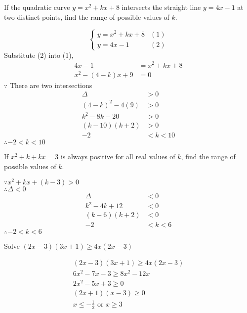 \documentclass[addpoints, 10pt]{exam}
\begin{document}
\begin{questions}
	\marksnotpoints
	\question[4] If the quadratic curve $y=x^2+kx+8$ intersects the straight line $y=4x-1$ at two distinct points, find the range of possible values of $k$.
	\begin{solutionorlines}[9cm]
		\begin{equation*}
			\begin{cases}
				y=x^2+kx+8 & (1) \\
				y=4x-1 & (2)
			\end{cases}
		\end{equation*}
		Substitute (2) into (1),
		\begin{align*}
			4x-1 &= x^2+kx+8 \\
			x^2-(4-k)x+9 &= 0
		\end{align*}
		$\because$ There are two intersections
		\begin{align*}
			\Delta &> 0 \\
			(4-k)^2-4(9) &> 0 \\
			k^2-8k-20 &> 0 \\
			(k-10)(k+2) &> 0 \\
			-2 &< k < 10
		\end{align*}
		$\therefore -2 < k < 10$
	\end{solutionorlines}

	\newpage

	\question[4] If $x^2+k+kx=3$ is always positive for all real values of $k$, find the range of possible values of $k$.
	\begin{solutionorlines}[9cm]
		$\because x^2+kx+(k-3) > 0$ \\
		$\therefore \Delta < 0$
		\begin{align*}
			\Delta &< 0 \\
			k^2-4k+12 &< 0 \\
			(k-6)(k+2) &< 0 \\
			-2 &< k < 6
		\end{align*}
		$\therefore -2 < k < 6$
	\end{solutionorlines}

	\question[3] Solve $(2x-3)(3x+1) \geq 4x(2x-3)$
	\begin{solutionorlines}[9cm]
		\begin{align*}
			(2x-3)(3x+1) \geq 4x(2x-3) \\
			6x^2-7x-3 \geq 8x^2-12x \\
			2x^2-5x+3 \geq 0 \\
			(2x+1)(x-3) \geq 0 \\
			x \leq -\tfrac{1}{2} \text{ or } x \geq 3
		\end{align*}
	\end{solutionorlines}
	

\end{questions}
\end{document}

